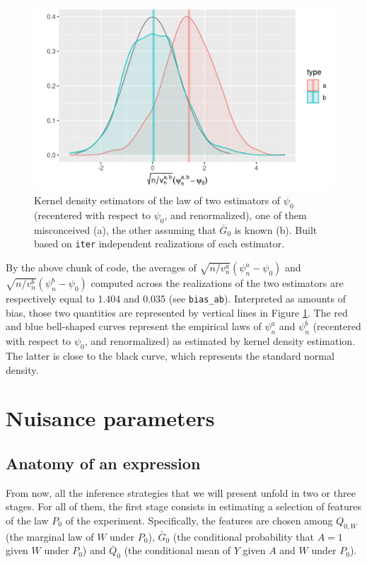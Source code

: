 \documentclass[11pt,openright,twoside]{book}
\newcommand{\Gbar}{\bar{G}}
\newcommand{\Qbar}{\bar{Q}}
\theoremstyle{definition}
\theoremstyle{definition}
\theoremstyle{definition}
\theoremstyle{remark}
\begin{document}
\begin{figure}

{\centering \includegraphics[width=0.7\linewidth]{img/known-Gbar-one-b-1} 

}

\caption{Kernel density estimators of the law of two estimators of \(\psi_{0}\) (recentered with respect to \(\psi_{0}\), and renormalized), one of them misconceived (a), the other assuming that \(\Gbar_{0}\) is known (b). Built based on \texttt{iter} independent realizations of each estimator.}\label{fig:known-Gbar-one-b}
\end{figure}

By the above chunk of code, the averages of \(\sqrt{n/v_{n}^{a}} (\psi_{n}^{a} - \psi_{0})\) and \(\sqrt{n/v_{n}^{b}} (\psi_{n}^{b} - \psi_{0})\)
computed across the realizations of the two estimators are respectively equal
to 1.404 and
0.035 (see \texttt{bias\_ab}). Interpreted as amounts of bias, those two
quantities are represented by vertical lines in Figure
\ref{fig:known-Gbar-one-b}. The red and blue bell-shaped curves represent the
empirical laws of \(\psi_{n}^{a}\) and \(\psi_{n}^{b}\) (recentered with respect
to \(\psi_{0}\), and renormalized) as estimated by kernel density estimation.
The latter is close to the black curve, which represents the standard normal
density.

\hypertarget{nuisance}{%
\chapter{Nuisance parameters}\label{nuisance}}

\hypertarget{anatomy}{%
\section{Anatomy of an expression}\label{anatomy}}


From now, all the inference strategies that we will present unfold in two or
three stages. For all of them, the first stage consists in estimating a
selection of features of the law \(P_{0}\) of the experiment. Specifically, the
features are chosen among \(Q_{0,W}\) (the marginal law of \(W\) under \(P_{0}\)),
\(\Gbar_{0}\) (the conditional probability that \(A=1\) given \(W\) under \(P_{0}\))
and \(\Qbar_{0}\) (the conditional mean of \(Y\) given \(A\) and \(W\) under \(P_{0}\)).
\end{document}
